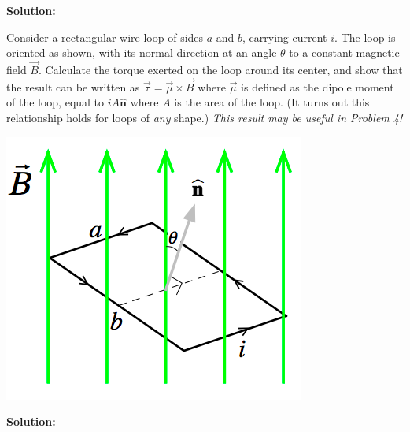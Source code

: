 \documentclass[11pt]{article}
\begin{document}
\textbf{Solution:}\\

\clearpage

\begin{problem}[3.]
Consider a rectangular wire loop of sides $a$ and $b$,
carrying current $i$. The loop is oriented as shown,
with its normal direction at an angle $\theta$ to a
constant magnetic field $\vec{B}$. Calculate the torque
exerted on the loop around its center, and show
that the result can be written as $\vec{\tau}=\vec{\mu} \times \vec{B}$ where $\vec{\mu}$
is defined as the dipole moment of the loop, equal
to $i A\hat{\textbf{n}}$ where $A$ is the area of the loop. (It turns
out this relationship holds for loops of \textit{any} shape.)
\textit{This result may be useful in Problem 4!}
\begin{center}
\includegraphics[scale=0.4]{prob3.png}
\end{center}
\end{problem}


\textbf{Solution:}\\

\clearpage
\end{document}
